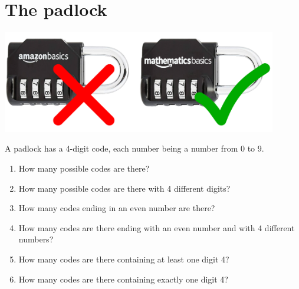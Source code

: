 \documentclass[]{article}
\begin{document}
	\section{The padlock}
	\begin{center}
		\includegraphics[width=12cm]{locks.pdf}
	\end{center}
	A padlock has a 4-digit code, each number being a number from 0 to 9.
	\begin{enumerate}
		\item How many possible codes are there?
		\item How many possible codes are there with 4 different digits?
		\item How many codes ending in an even number are there?
		\item How many codes are there ending with an even number and with 4 different numbers?
		\item How many codes are there containing at least one digit 4?
		\item How many codes are there containing exactly one digit 4?
	\end{enumerate}
	
	\newpage
\end{document}
